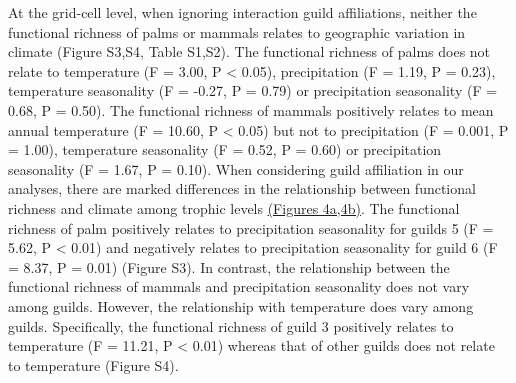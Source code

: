 \documentclass[
]{agujournal2019}
\begin{document}
At the grid-cell level, when ignoring interaction guild affiliations,
neither the functional richness of palms or mammals relates to
geographic variation in climate (Figure S3,S4, Table S1,S2). The
functional richness of palms does not relate to temperature (F = 3.00, P
\textless{} 0.05), precipitation (F = 1.19, P = 0.23), temperature
seasonality (F = -0.27, P = 0.79) or precipitation seasonality (F =
0.68, P = 0.50). The functional richness of mammals positively relates
to mean annual temperature (F = 10.60, P \textless{} 0.05) but not to
precipitation (F = 0.001, P = 1.00), temperature seasonality (F = 0.52,
P = 0.60) or precipitation seasonality (F = 1.67, P = 0.10). When
considering guild affiliation in our analyses, there are marked
differences in the relationship between functional richness and climate
among trophic levels \hyperref[fig04]{(Figures 4a,4b)}. The functional
richness of palm positively relates to precipitation seasonality for
guilds 5 (F = 5.62, P \textless{} 0.01) and negatively relates to
precipitation seasonality for guild 6 (F = 8.37, P = 0.01) (Figure S3).
In contrast, the relationship between the functional richness of mammals
and precipitation seasonality does not vary among guilds. However, the
relationship with temperature does vary among guilds. Specifically, the
functional richness of guild 3 positively relates to temperature (F =
11.21, P \textless{} 0.01) whereas that of other guilds does not relate
to temperature (Figure S4).
\end{document}
